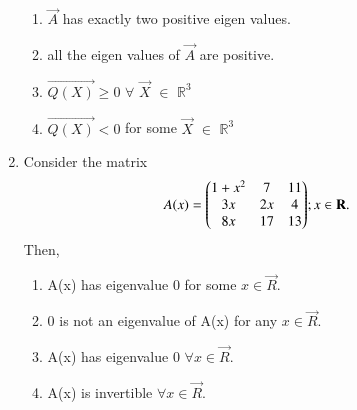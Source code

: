 \begin{enumerate}[label=\thesection.\arabic*.,ref=\thesection.\theenumi]
\begin{enumerate}
	\item $\vec{A}$ has exactly two positive eigen values.
	\item all the eigen values of $\vec{A}$ are positive.
	\item $\vec{Q(X)} \geq 0 $ $\forall$ $\vec{X}$ $\in$ $\mathbb{R}^3$
	\item $\vec{Q(X)} < 0 $ for some $\vec{X}$ $\in$ $\mathbb{R}^3$
\end{enumerate}
%
%
\solution

\item Consider the matrix
\begin{align}
A(x) = \begin{pmatrix}1+x^2&7&11\\3x&2x&4\\8x&17&13\end{pmatrix} & ;x\in \mathbf{R}.
\end{align}
Then,
\begin{enumerate}
\item A(x) has eigenvalue 0 for some $x\in \vec{R}$.
\item 0 is not an eigenvalue of A(x) for any $x\in \vec{R}$.
\item A(x) has eigenvalue 0 $\forall x\in \vec{R}$.
\item A(x) is invertible $\forall x\in \vec{R}$.
\end{enumerate}
%
\solution

\end{enumerate}
